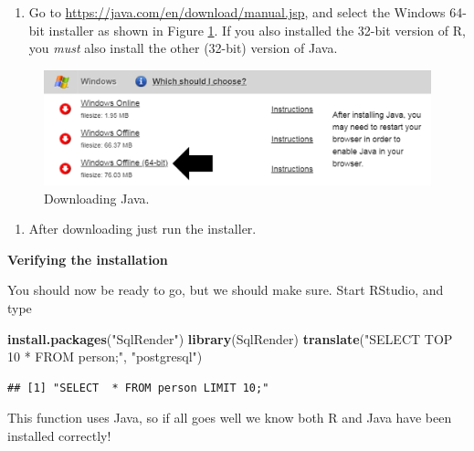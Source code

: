\documentclass[11pt]{book}
\newenvironment{Shaded}{\begin{snugshade}}{\end{snugshade}}
\newcommand{\KeywordTok}[1]{\textcolor[rgb]{0.13,0.29,0.53}{\textbf{#1}}}
\newcommand{\NormalTok}[1]{#1}
\newcommand{\StringTok}[1]{\textcolor[rgb]{0.31,0.60,0.02}{#1}}
\providecommand{\tightlist}{%
  \setlength{\itemsep}{0pt}\setlength{\parskip}{0pt}}
\theoremstyle{definition}
\theoremstyle{definition}
\theoremstyle{definition}
\theoremstyle{remark}
\begin{document}
\begin{enumerate}
\def\labelenumi{\arabic{enumi}.}
\tightlist
\item
  Go to \url{https://java.com/en/download/manual.jsp}, and select the Windows 64-bit installer as shown in Figure \ref{fig:downloadJava}. If you also installed the 32-bit version of R, you \emph{must} also install the other (32-bit) version of Java.
\end{enumerate}

\begin{figure}

{\centering \includegraphics[width=1\linewidth]{images/OhdsiAnalyticsTools/downloadJava} 

}

\caption{Downloading Java.}\label{fig:downloadJava}
\end{figure}

\begin{enumerate}
\def\labelenumi{\arabic{enumi}.}
\setcounter{enumi}{1}
\tightlist
\item
  After downloading just run the installer.
\end{enumerate}

\textbf{Verifying the installation}

You should now be ready to go, but we should make sure. Start RStudio, and type

\begin{Shaded}
\begin{Highlighting}[]
\KeywordTok{install.packages}\NormalTok{(}\StringTok{"SqlRender"}\NormalTok{)}
\KeywordTok{library}\NormalTok{(SqlRender)}
\KeywordTok{translate}\NormalTok{(}\StringTok{"SELECT TOP 10 * FROM person;"}\NormalTok{, }\StringTok{"postgresql"}\NormalTok{)}
\end{Highlighting}
\end{Shaded}

\begin{verbatim}
## [1] "SELECT  * FROM person LIMIT 10;"
\end{verbatim}

This function uses Java, so if all goes well we know both R and Java have been installed correctly!
\end{document}
